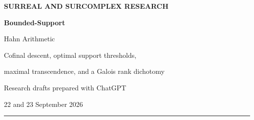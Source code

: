 \documentclass[11pt,letterpaper]{article}
\theoremstyle{definition}
\theoremstyle{remark}
\newcommand{\R}{\mathbb R}
\newcommand{\C}{\mathbb C}
\newcommand{\Frac}{\operatorname{Frac}}
\newcommand{\cof}{\operatorname{cf}}
\begin{document}
\hypersetup{pageanchor=false}
\begin{titlepage}
\thispagestyle{empty}
\vspace*{0.4in}
{\small\sffamily\bfseries\color{ink} SURREAL AND SURCOMPLEX RESEARCH}\par
\vspace{0.25in}
{\Huge\bfseries\color{ink} Bounded-Support\par Hahn Arithmetic}\par
\vspace{0.2in}
{\LARGE Cofinal descent, optimal support thresholds,\par maximal transcendence, and a Galois rank dichotomy}\par
\vspace{0.3in}
{\large Research drafts prepared with ChatGPT\par 22 and 23 September 2026}\par
\vspace{0.25in}
\noindent\rule{\textwidth}{0.6pt}
\begin{abstract}
Let $G$ be a nonzero set-sized ordered abelian group, let $K$ have characteristic
zero, and let $\mathcal B_G(K)$ be the ring of Hahn series whose support is
bounded above in $G$. Put $\mathcal F_G(K)=\Frac\mathcal B_G(K)$ and
$\kappa=\cof(G)$. We construct $2^\kappa$ elements of $K((t^G))$, all with
positive integer coefficients and one common support of order type $\kappa$,
that are algebraically independent over $\mathcal F_G(K)$. No smaller support
cardinality can support even one transcendental element over this base.
Every valuation ball contains such an independent family. In particular, the
transcendence degree is the continuum for real-exponent Hahn fields over
$\R$ or $\C$.

A complementary descent theorem proves that, whenever $H\subseteq G$ is
cofinal and $K\subseteq L$, the fields $K((t^H))$ and $\mathcal F_G(L)$ are
linearly disjoint over $\mathcal F_H(K)$. Polynomial relation ideals and finite
algebraic degrees therefore survive simultaneous enlargement of coefficients
and cofinal exponent groups. We also classify when $\mathcal B_G(K)$ is a
field, reduce its unit theory to the highest Archimedean quotient, and prove
a conditional GCD-descent theorem relevant to a published pre-Schreier
question. Concrete Conway-normal-form specializations give independent
families of actual surreal numbers, including maximal families of size
$2^\kappa$ at every infinite regular cardinal.


\end{abstract}
\end{titlepage}
\end{document}

